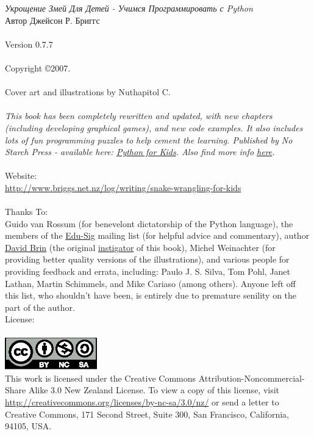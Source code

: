 \noindent
\textsf{\emph{Укрощение Змей Для Детей - Учимся Программировать с Python}}\\
Автор Джейсон Р. Бриггс\\
\\
Version 0.7.7
\\\\
Copyright \copyright 2007.\\
\\
Cover art and illustrations by Nuthapitol C.\\
\\
\noindent
\textsf{\emph{This book has been completely rewritten and updated, with new chapters (including developing graphical games), and new code examples. It also includes lots of fun programming puzzles to help cement the learning. Published by No Starch Press - available here: \href{http://nostarch.com/pythonforkids}{Python for Kids}. Also find more info \href{http://jasonrbriggs.com/python-for-kids/}{here}.}}
\\
\\
\linebreak
\noindent
Website:\\ \href{http://www.briggs.net.nz/log/writing/snake-wrangling-for-kids}{http://www.briggs.net.nz/log/writing/snake-wrangling-for-kids}\\ 
\\
\noindent
Thanks To:\\
Guido van Rossum (for benevelont dictatorship of the Python language), the members of the \href{http://www.python.org/community/sigs/current/edu-sig/}{Edu-Sig} mailing list (for helpful advice and commentary), author \href{http://www.davidbrin.com/}{David Brin} (the original \href{http://www.salon.com/tech/feature/2006/09/14/basic/}{instigator} of this book), Michel Weinachter (for providing better quality versions of the illustrations), and various people for providing feedback and errata, including: Paulo J. S. Silva, Tom Pohl, Janet Lathan, Martin Schimmels, and Mike Cariaso (among others).  Anyone left off this list, who shouldn't have been, is entirely due to premature senility on the part of the author.\\

\noindent
License:\\
\\
\includegraphics[width=40mm]{by-nc-sa.eps}\\
This work is licensed under the Creative Commons Attribution-Noncommercial-Share Alike 3.0 New Zealand License. To view a copy of this license, visit\\ \href{http://creativecommons.org/licenses/by-nc-sa/3.0/nz/}{http://creativecommons.org/licenses/by-nc-sa/3.0/nz/} or send a letter to Creative Commons, 171 Second Street, Suite 300, San Francisco, California, 94105, USA.\\

